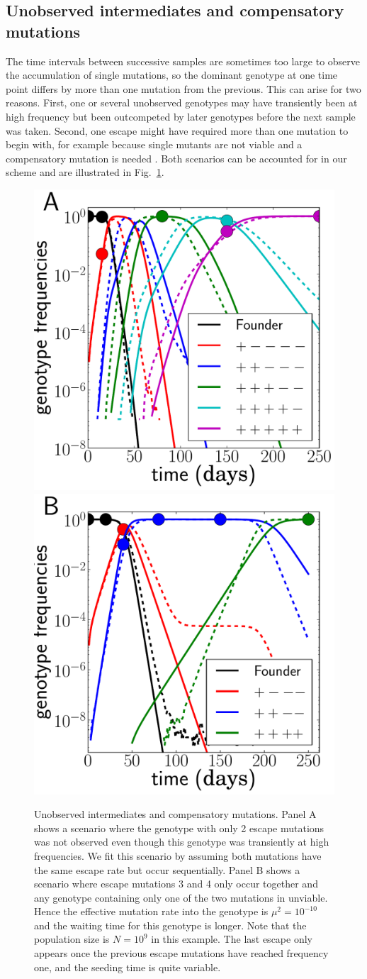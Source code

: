 \documentclass{frontiers}
\newcommand{\FIG}[1]{Fig.~\ref{fig:#1}}
\begin{document}
\subsection{Unobserved intermediates and compensatory mutations}
The time intervals between successive samples are sometimes too large to observe
the accumulation of single mutations, so the dominant genotype at one
time point differs by more than one mutation from the previous. This can arise
for two reasons. First, one or several unobserved genotypes may have transiently been at
high frequency but been outcompeted by later genotypes before the next sample
was taken.
Second, one escape might have required more than one mutation to begin with, for 
example because
single mutants are not viable and a compensatory mutation is needed
\citep{read_stochastic_2012}. Both scenarios can be accounted for in our scheme
and are illustrated in \FIG{degenerate}.

\begin{figure}[htp]
\begin{center}
  \includegraphics[width=0.24\columnwidth]{figures_manuscript/sequential_degen_traj_log.pdf}
  \includegraphics[width=0.24\columnwidth]{figures_manuscript/sequential_valley_traj_fit_log.pdf}
  \caption[labelInTOC]{Unobserved intermediates and compensatory mutations.
  Panel A shows a scenario where the genotype with only 2 escape mutations
  was not observed even though this genotype was transiently at high frequencies.
  We fit this scenario by assuming both mutations have the same escape rate but
  occur sequentially. Panel B shows a scenario where escape mutations 3 and 4
  only occur together and any genotype containing only one of the two mutations
  in unviable. Hence the effective mutation rate into the genotype is
  $\mu^2=10^{-10}$ and the waiting time for this genotype is longer. Note that
  the population size is $N=10^9$ in this example. The last escape only appears
  once the previous escape mutations have reached frequency one, and the seeding
  time is quite variable.  }
  \label{fig:degenerate}
\end{center}
\end{figure}
\end{document}
